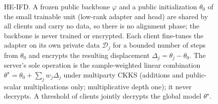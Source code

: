 \begin{figure}[t]
{%
}
\caption{HE-IFD. A frozen public backbone $\varphi$ and a public initialization $\theta_0$ of the small
trainable unit (low-rank adapter and head) are shared by all clients and carry no data, so there is no
alignment phase; the backbone is never trained or encrypted. Each client fine-tunes the adapter on its own
private data $\mathcal{D}_j$ for a bounded number of steps from $\theta_0$ and encrypts the resulting
displacement $\Delta_j=\theta_j-\theta_0$. The server's sole operation is the sample-weighted linear combination
$\theta^\star=\theta_0+\sum_j w_j\Delta_j$ under multiparty CKKS (additions and public-scalar
multiplications only; multiplicative depth one); it never decrypts. A threshold of clients jointly decrypts
the global model $\theta^\star$.}
\label{fig:protocol}
\end{figure}
